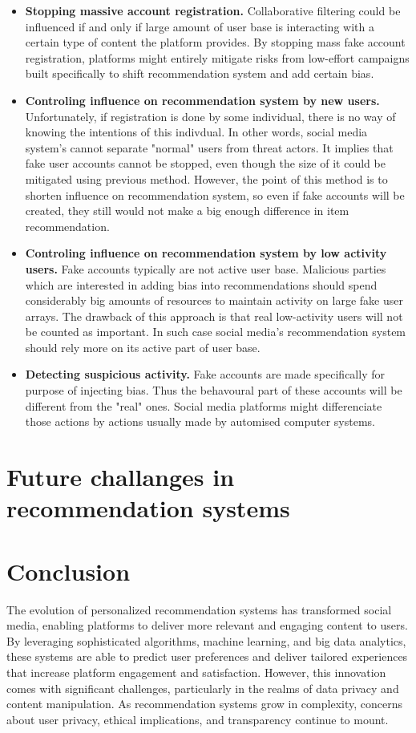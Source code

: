 \documentclass[10pt,twocolumn,twoside,a4paper]{report} %
\begin{document}
\begin{itemize}
    \item \textbf{Stopping massive account registration.} Collaborative filtering could be influenced if and only if large amount of user base is interacting with a certain type of content the platform provides. By stopping mass fake account registration, platforms might entirely mitigate risks from low-effort campaigns built specifically to shift recommendation system and add certain bias.
    \item \textbf{Controling influence on recommendation system by new users.} Unfortunately, if registration is done by some individual, there is no way of knowing the intentions of this indivdual. In other words, social media system's cannot separate "normal" users from threat actors. It implies that fake user accounts cannot be stopped, even though the size of it could be mitigated using previous method. However, the point of this method is to shorten influence on recommendation system, so even if fake accounts will be created, they still would not make a big enough difference in item recommendation.
    \item \textbf{Controling influence on recommendation system by low activity users.} Fake accounts typically are not active user base. Malicious parties which are interested in adding bias into recommendations should spend considerably big amounts of resources to maintain activity on large fake user arrays. The drawback of this approach is that real low-activity users will not be counted as important. In such case social media's recommendation system should rely more on its active part of user base.
    \item \textbf{Detecting suspicious activity.} Fake accounts are made specifically for purpose of injecting bias. Thus the behavoural part of these accounts will be different from the "real" ones. Social media platforms might differenciate those actions by actions usually made by automised computer systems.
\end{itemize}

\section{Future challanges in recommendation systems} \label{content_manipulation}

\section{Conclusion} \label{conclusion}
The evolution of personalized recommendation systems has transformed social media, enabling platforms to deliver more relevant and engaging content to users. By leveraging sophisticated algorithms, machine learning, and big data analytics, these systems are able to predict user preferences and deliver tailored experiences that increase platform engagement and satisfaction. However, this innovation comes with significant challenges, particularly in the realms of data privacy and content manipulation. As recommendation systems grow in complexity, concerns about user privacy, ethical implications, and transparency continue to mount. 
\end{document}
